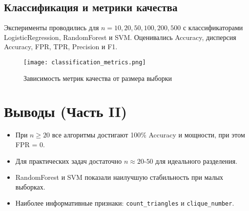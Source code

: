 \documentclass[a4paper, 12pt]{article}
\begin{document}
\subsection{Классификация и метрики качества}
Эксперименты проводились для $n=10,20,50,100,200,500$ с классификаторами 
LogisticRegression, RandomForest и SVM. Оценивались Accuracy, дисперсия Accuracy, FPR, TPR, Precision и F1.

\begin{figure}[H]
\centering
\texttt{[image: classification\_metrics.png]}
\caption{Зависимость метрик качества от размера выборки}
\label{fig:metrics}
\end{figure}

\section{Выводы (Часть II)}
\begin{itemize}
\item При $n\ge20$ все алгоритмы достигают 100\% Accuracy и мощности, при этом FPR = 0.
\item Для практических задач достаточно $n\approx20\text{-}50$ для идеального разделения.
\item RandomForest и SVM показали наилучшую стабильность при малых выборках.
\item Наиболее информативные признаки: \texttt{count\_triangles} и \texttt{clique\_number}.
\end{itemize}
\end{document}
